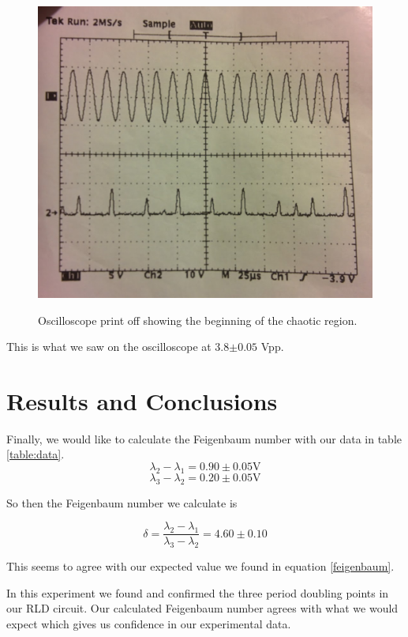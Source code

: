 \documentclass[12pt letterpaper]{article}
\begin{document}
\begin{figure}[H]
  \caption{Oscilloscope print off showing the beginning of the chaotic region.}
  \centering
    \includegraphics[width=.60\textwidth]{chaos.jpg}
    \label{fig:chaos}
\end{figure}

This is what we saw on the oscilloscope at 3.8$\pm0.05$ Vpp. 



\section*{Results and Conclusions}

Finally, we would like to calculate the Feigenbaum number with our data in table \ref{table:data}. 
$$ 
\lambda_2 - \lambda_1 =  0.90\pm0.05 \mathrm{V} 
$$
$$ 
\lambda_3 - \lambda_2 = 0.20\pm0.05 \mathrm{V}
$$

So then the Feigenbaum number we calculate is 

$$ 
\delta = \frac{\lambda_2 - \lambda_1}{\lambda_3 - \lambda_2} = 4.60 \pm 0.10 
$$

This seems to agree with our expected value we found in equation \ref{feigenbaum}. 

In this experiment we found and confirmed the three period doubling points in our RLD circuit. Our calculated Feigenbaum number agrees with what we would expect which gives us confidence in our experimental data. 
\end{document}
